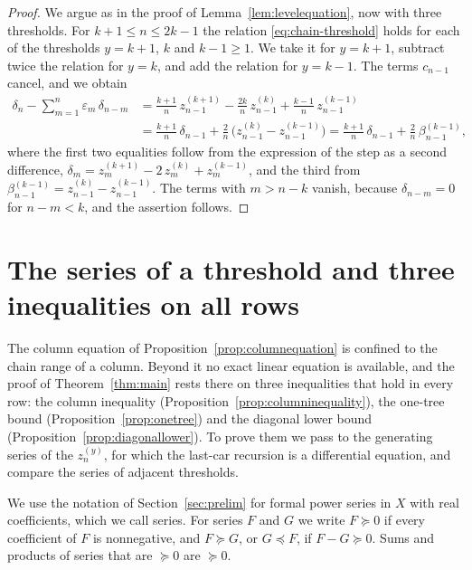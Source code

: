 \documentclass{amsart}
\makeatletter
\theoremstyle{definition}
\theoremstyle{remark}
\numberwithin{equation}{section}
\def\subsection{\@startsection{subsection}{2}\z@{.5\linespacing\@plus.7\linespacing}{-.5em}{\normalfont\bfseries\boldmath}}
\makeatother
\begin{document}
\begin{proof}
We argue as in the proof of Lemma~\ref{lem:levelequation}, now with three thresholds. For $k+1\le n\le 2k-1$ the relation \eqref{eq:chain-threshold} holds for each of the thresholds $y=k+1$, $k$ and $k-1\ge 1$. We take it for $y=k+1$, subtract twice the relation for $y=k$, and add the relation for $y=k-1$. The terms $c_{n-1}$ cancel, and we obtain
\begin{align*}
\delta_n-\sum_{m=1}^{n}\varepsilon_m\,\delta_{n-m}
&=\frac{k+1}{n}\,z^{(k+1)}_{n-1}-\frac{2k}{n}\,z^{(k)}_{n-1}+\frac{k-1}{n}\,z^{(k-1)}_{n-1}\\
&=\frac{k+1}{n}\,\delta_{n-1}+\frac{2}{n}\,\bigl(z^{(k)}_{n-1}-z^{(k-1)}_{n-1}\bigr)
=\frac{k+1}{n}\,\delta_{n-1}+\frac{2}{n}\,\beta^{(k-1)}_{n-1},
\end{align*}
where the first two equalities follow from the expression of the step as a second difference, $\delta_m=z^{(k+1)}_m-2\,z^{(k)}_m+z^{(k-1)}_m$, and the third from $\beta^{(k-1)}_{n-1}=z^{(k)}_{n-1}-z^{(k-1)}_{n-1}$. The terms with $m>n-k$ vanish, because $\delta_{n-m}=0$ for $n-m<k$, and the assertion follows.
\end{proof}

\section{The series of a threshold and three inequalities on all rows}\label{sec:series}
The column equation of Proposition~\ref{prop:columnequation} is confined to the chain range of a column. Beyond it no exact linear equation is available, and the proof of Theorem~\ref{thm:main} rests there on three inequalities that hold in every row: the column inequality (Proposition~\ref{prop:columninequality}), the one-tree bound (Proposition~\ref{prop:onetree}) and the diagonal lower bound (Proposition~\ref{prop:diagonallower}). To prove them we pass to the generating series of the $z^{(y)}_n$, for which the last-car recursion is a differential equation, and compare the series of adjacent thresholds.

We use the notation of Section~\ref{sec:prelim} for formal power series in $X$ with real coefficients, which we call series. For series $F$ and $G$ we write $F\succeq 0$ if every coefficient of $F$ is nonnegative, and $F\succeq G$, or $G\preceq F$, if $F-G\succeq 0$. Sums and products of series that are $\succeq 0$ are $\succeq 0$.

\subsection{The series of a threshold}\label{subsec:series-threshold}
\end{document}
